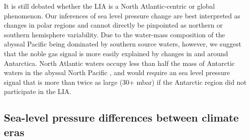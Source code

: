 \documentclass[12pt]{article}
\begin{document}
It is still debated whether the LIA is a North Atlantic-centric or
global phenomenon. Our inferences of sea level pressure change are
best interpreted as changes in polar regions and cannot directly be
pinpointed as northern or southern hemisphere variability. Due to the
water-mass composition of the abyssal Pacific being dominated by
southern source waters, however, we suggest that the noble gas signal
is more easily explained by changes in and around Antarctica. North
Atlantic waters occupy less than half the mass of Antarctic waters in
the abyssal North Pacific \cite{Johnson--2008:Quantifying}, and would
require an sea level pressure signal that is more than twice as large
(30+ mbar) if the Antarctic region did not participate in the LIA.

\subsection{Sea-level pressure differences between climate eras}
\label{sec:slp-differences}
\end{document}

